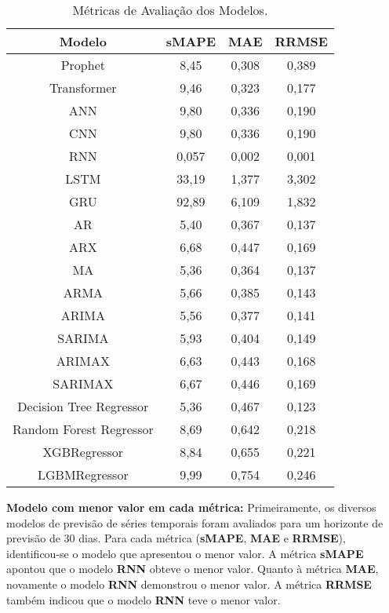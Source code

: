 \begin{table}[H]
	\centering
	\caption{Métricas de Avaliação dos Modelos.}
	\label{tab:metrics}
	\small
	
	\begin{tabular}{cccc}
		\hline
		
		\textbf{Modelo} & \textbf{sMAPE} & \textbf{MAE} & \textbf{RRMSE} \\
		\hline
		Prophet & 8,45 & 0,308 & 0,389 \\
		Transformer & 9,46 & 0,323 & 0,177 \\
		ANN & 9,80 & 0,336 & 0,190 \\
		CNN & 9,80 & 0,336 & 0,190 \\
		RNN & 0,057 & 0,002 & 0,001 \\
		LSTM & 33,19 & 1,377 & 3,302 \\
		GRU & 92,89 & 6,109 & 1,832 \\
		AR & 5,40 & 0,367 & 0,137 \\
		ARX & 6,68 & 0,447 & 0,169 \\
		MA & 5,36 & 0,364 & 0,137 \\
		ARMA & 5,66 & 0,385 & 0,143 \\
		ARIMA & 5,56 & 0,377 & 0,141 \\
		SARIMA & 5,93 & 0,404 & 0,149 \\
		ARIMAX & 6,63 & 0,443 & 0,168 \\
		SARIMAX & 6,67 & 0,446 & 0,169 \\
		Decision Tree Regressor & 5,36 & 0,467 & 0,123 \\
		Random Forest Regressor & 8,69 & 0,642 & 0,218 \\
		XGBRegressor & 8,84 & 0,655 & 0,221 \\
		LGBMRegressor & 9,99 & 0,754 & 0,246 \\
		\hline
	\end{tabular}
	
\end{table}




\noindent\textbf{Modelo com menor valor em cada métrica:}	
Primeiramente, os diversos modelos de previsão de séries temporais foram avaliados para um horizonte de previsão de 30 dias. Para cada métrica (\textbf{sMAPE}, \textbf{MAE} e \textbf{RRMSE}), identificou-se o modelo que apresentou o menor valor.
A métrica \textbf{sMAPE} apontou que o modelo \textbf{RNN} obteve o menor valor.
Quanto à métrica \textbf{MAE}, novamente o modelo \textbf{RNN} demonstrou o menor valor.
A métrica \textbf{RRMSE} também indicou que o modelo \textbf{RNN} teve o menor valor.


